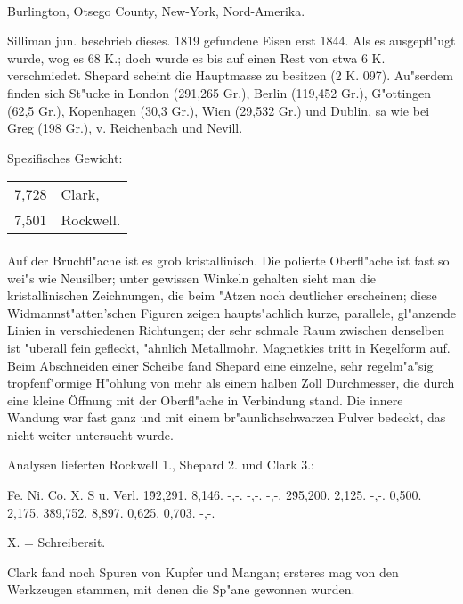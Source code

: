 \documentclass[a4paper, 11pt, oneside]{article}
\begin{document}
\paragraph{}
Burlington, Otsego County, New-York, Nord-Amerika.

Silliman jun. beschrieb dieses. 1819 gefundene Eisen erst 1844. Als es ausgepfl"ugt wurde, wog es 68 K.; doch wurde es bis auf einen Rest von etwa 6 K. verschmiedet. Shepard scheint die Hauptmasse zu besitzen (2 K. 097). Au"serdem finden sich St"ucke in London (291,265 Gr.), Berlin (119,452 Gr.), G"ottingen (62,5 Gr.), Kopenhagen (30,3 Gr.), Wien (29,532 Gr.) und Dublin, sa wie bei Greg (198 Gr.), v. Reichenbach und Nevill.

Spezifisches Gewicht:  
\begin{table}[!ht]
    \centering
    \begin{tabular}{l l}
        7,728 & Clark,\\
        7,501 & Rockwell.
    \end{tabular}
\end{table}
\paragraph{}
Auf der Bruchfl"ache ist es grob kristallinisch. Die polierte Oberfl"ache ist fast so wei"s wie Neusilber; unter gewissen Winkeln gehalten sieht man die kristallinischen Zeichnungen, die beim "Atzen noch deutlicher erscheinen; diese Widmannst"atten'schen Figuren zeigen haupts"achlich kurze, parallele, gl"anzende Linien in verschiedenen Richtungen; der sehr schmale Raum zwischen denselben ist "uberall fein gefleckt, "ahnlich Metallmohr. Magnetkies tritt in Kegelform auf. Beim Abschneiden einer Scheibe fand Shepard eine einzelne, sehr regelm"a"sig tropfenf"ormige H"ohlung von mehr als einem halben Zoll Durchmesser, die durch eine kleine Öffnung mit der Oberfl"ache in Verbindung stand. Die innere Wandung war fast ganz und mit einem br"aunlichschwarzen Pulver bedeckt, das nicht weiter untersucht wurde.

Analysen lieferten Rockwell 1., Shepard 2. und Clark 3.:

Fe. Ni. Co. X. S u. Verl.  
1\. 92,291. 8,146. -,-. -,-. -,-.  
2\. 95,200. 2,125. -,-. 0,500. 2,175.  
3\. 89,752. 8,897. 0,625. 0,703. -,-.

X. = Schreibersit.

Clark fand noch Spuren von Kupfer und Mangan; ersteres mag von den Werkzeugen stammen, mit denen die Sp"ane gewonnen wurden.
\end{document}
